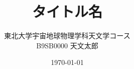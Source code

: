 \documentclass[a4paper,papersize,uplatex,dvipdfmx,10pt]{jsarticle}
\title{タイトル名}
\author{東北大学宇宙地球物理学科天文学コース\\B9SB0000\,\,天文太郎}
\date{\today}
\begin{document}
\maketitle

\nocite{*}



\renewcommand{\bibname}{参考文献}
%


\end{document}
